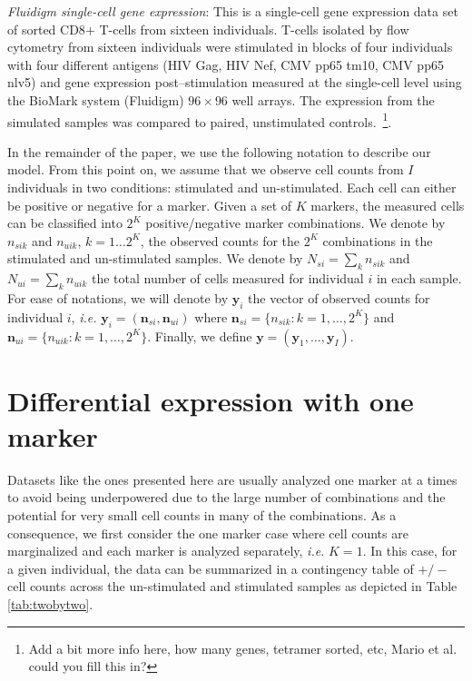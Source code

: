 \documentclass[11pt]{article}
\begin{document}
\textit{Fluidigm single-cell gene expression}: This is a single-cell gene expression data set of sorted CD8$+$ T-cells from sixteen individuals. T-cells isolated by flow cytometry from sixteen individuals were stimulated in blocks of four individuals with four different antigens (HIV Gag, HIV Nef, CMV pp65 tm10, CMV pp65 nlv5) and gene expression post--stimulation measured at the single-cell level using the BioMark system (Fluidigm) $96 \times 96$ well arrays. The expression from the simulated samples  was compared to paired, unstimulated controls.~\footnote{Add a bit more info here, how many genes, tetramer sorted, etc, Mario et al. could you fill this in?}.


In the remainder of the paper, we use the following notation to describe our model.  From this point on, we assume that we observe cell counts from $I$ individuals in two conditions: stimulated and un-stimulated. Each cell can either be positive or negative for a marker. Given a set of $K$ markers, the measured cells can be classified into $2^K$ positive/negative marker combinations. We denote by $n_{sik}$ and $n_{uik}$, $k=1\dots 2^K$, the observed counts for the $2^K$ combinations in the stimulated and un-stimulated samples. We denote by $N_{si}=\sum_k n_{sik}$ and $N_{ui}=\sum_k n_{uik}$ the total number of cells measured for individual $i$ in each sample. For ease of notations, we will denote by $\mathbf{y}_i$ the vector of observed counts for individual $i$, \textit{i.e.} $\mathbf{y}_{i}=(\mathbf{n}_{si}, \mathbf{n}_{ui})$ where $\mathbf{n}_{si}=\{n_{sik}: k=1,\dots,2^K\}$ and $\mathbf{n}_{ui}=\{n_{uik}: k=1,\dots,2^K\}$. Finally, we define $\mathbf{y}=(\mathbf{y}_1,\dots,\mathbf{y}_I)$.

\section{Differential expression with one marker}
Datasets like the ones presented here are usually analyzed one marker at a times to avoid being underpowered due to the large number of combinations and the potential for very small cell counts in many of the combinations. As a consequence, we first consider the one marker case where cell counts are marginalized and each marker is analyzed separately, \textit{i.e.} $K=1$. In this case, for a given individual, the data can be summarized in a contingency table of $+/-$ cell counts across the un-stimulated and stimulated samples as depicted in Table \ref{tab:twobytwo}.
\end{document}
